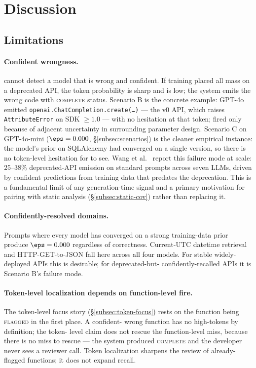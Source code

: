 \section{Discussion}
\label{sec:discussion}

\subsection{Limitations}
\label{subsec:limitations}

\paragraph{Confident wrongness.} \eps cannot detect a model that is
wrong and confident. If training placed all mass on a deprecated API,
the token probability is sharp and \eps is low; the system emits the
wrong code with \textsc{complete} status. Scenario B is the
concrete example: GPT-4o emitted
\texttt{openai.ChatCompletion.create(\ldots)} --- the v0 API, which
raises \texttt{AttributeError} on SDK $\ge 1.0$ --- with no
hesitation at that token; \eps fired only because of adjacent
uncertainty in surrounding parameter design. Scenario C on
GPT-4o-mini ($\eps = 0.000$, \S\ref{subsec:scenarios}) is the cleaner
empirical instance: the model's prior on SQLAlchemy had converged
on a single version, so there is no token-level hesitation for
\eps to see. Wang et al.~\cite{wang2025deprecated} report this
failure mode at scale: $25$--$38\%$ deprecated-API emission on
standard prompts across seven LLMs, driven by confident predictions
from training data that predates the deprecation. This is a
fundamental limit of any generation-time signal and a primary
motivation for pairing \eps with static analysis
(\S\ref{subsec:static-cov}) rather than replacing it.

\paragraph{Confidently-resolved domains.} Prompts where every model
has converged on a strong training-data prior produce $\eps = 0.000$
regardless of correctness. Current-UTC datetime retrieval and
HTTP-GET-to-JSON fall here across all four models. For stable
widely-deployed APIs this is desirable; for deprecated-but-%
confidently-recalled APIs it is Scenario B's failure mode.

\paragraph{Token-level localization depends on function-level fire.}
The token-level focus story (\S\ref{subsec:token-focus}) rests on
the function being \textsc{flagged} in the first place. A confident-%
wrong function has no high-\eps tokens by definition; the token-%
level claim does not rescue the function-level miss, because there
is no miss to rescue --- the system produced \textsc{complete} and
the developer never sees a reviewer call. Token localization
sharpens the review of already-flagged functions; it does not expand
recall.

